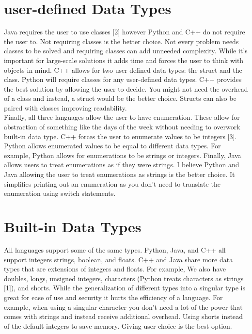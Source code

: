 \documentclass[sigconf, nonacm, authorversion, language=english, 12pt]{acmart}
\def\tab{\hspace*{5mm}}
\begin{document}
\section{user-defined Data Types}
\tab Java requires the user to use classes [2] however Python and C++ do not require the user to. Not requiring classes is the better choice. Not every problem needs classes to be solved and requiring
classes can add unneeded complexity. While it's important for large-scale solutions it adds time and forces the user to think with objects in mind. C++ allows for two user-defined data types: the struct
and the class. Python will require classes for any user-defined data types. C++ provides the best solution by allowing the user to decide. You might not need the overhead of a class and instead, a struct
would be the better choice. Structs can also be paired with classes improving readability. \\

\tab Finally, all three languages allow the user to have enumeration. These allow for abstraction of something like the days
of the week without needing to overwork built-in data type. C++ forces the user to enumerate values to be integers [3]. Python allows enumerated values to be equal to different data types. For example,
Python allows for enumerations to be strings or integers. Finally, Java allows users to treat enumerations as if they were strings. I believe Python and Java allowing the user to treat enumerations as strings
is the better choice. It simplifies printing out an enumeration as you don't need to translate the enumeration using switch statements.\\

\section{Built-in Data Types}
\tab All languages support some of the same types. Python, Java, and C++ all support integers strings, boolean, and floats. C++ and Java share more
data types that are extensions of integers and floats. For example, We also have doubles, longs, unsigned integers, characters (Python treats characters as strings [1]), and shorts. While the generalization
of different types into a singular type is great for ease of use and security it hurts the efficiency of a language. For example, when using a singular character you don't need a lot of the power that comes with strings and
instead receive additional overhead. Using shorts instead of the default integers to save memory. Giving user choice is the best option.\\
\end{document}
